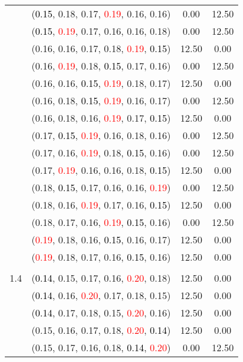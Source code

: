 \documentclass[10pt,a4paper]{report}
\begin{document}
\begin{center}
\begin{longtable}{clcc}
			&(\textcolor{black}{0.15}, 0.18, 0.17, \textcolor{red}{0.19}, 0.16, 0.16)&0.00&12.50\\
			&(\textcolor{black}{0.15}, \textcolor{red}{0.19}, 0.17, 0.16, 0.16, 0.18)&0.00&12.50\\
			&(0.16, 0.16, 0.17, 0.18, \textcolor{red}{0.19}, \textcolor{black}{0.15})&12.50&0.00\\
			&(0.16, \textcolor{red}{0.19}, 0.18, \textcolor{black}{0.15}, 0.17, 0.16)&0.00&12.50\\
			&(0.16, 0.16, \textcolor{black}{0.15}, \textcolor{red}{0.19}, 0.18, 0.17)&12.50&0.00\\
			&(0.16, 0.18, \textcolor{black}{0.15}, \textcolor{red}{0.19}, 0.16, 0.17)&0.00&12.50\\
			&(0.16, 0.18, 0.16, \textcolor{red}{0.19}, 0.17, \textcolor{black}{0.15})&12.50&0.00\\
			&(0.17, \textcolor{black}{0.15}, \textcolor{red}{0.19}, 0.16, 0.18, 0.16)&0.00&12.50\\
			&(0.17, 0.16, \textcolor{red}{0.19}, 0.18, \textcolor{black}{0.15}, 0.16)&0.00&12.50\\
			&(0.17, \textcolor{red}{0.19}, 0.16, 0.16, 0.18, \textcolor{black}{0.15})&12.50&0.00\\
			&(0.18, \textcolor{black}{0.15}, 0.17, 0.16, 0.16, \textcolor{red}{0.19})&0.00&12.50\\
			&(0.18, 0.16, \textcolor{red}{0.19}, 0.17, 0.16, \textcolor{black}{0.15})&12.50&0.00\\
			&(0.18, 0.17, 0.16, \textcolor{red}{0.19}, \textcolor{black}{0.15}, 0.16)&0.00&12.50\\
			&(\textcolor{red}{0.19}, 0.18, 0.16, \textcolor{black}{0.15}, 0.16, 0.17)&12.50&0.00\\
			&(\textcolor{red}{0.19}, 0.18, 0.17, 0.16, \textcolor{black}{0.15}, 0.16)&12.50&0.00\\
		&&&\\
		1.4			&(\textcolor{black}{0.14}, 0.15, 0.17, 0.16, \textcolor{red}{0.20}, 0.18)&12.50&0.00\\
			&(\textcolor{black}{0.14}, 0.16, \textcolor{red}{0.20}, 0.17, 0.18, 0.15)&12.50&0.00\\
			&(\textcolor{black}{0.14}, 0.17, 0.18, 0.15, \textcolor{red}{0.20}, 0.16)&12.50&0.00\\
			&(0.15, 0.16, 0.17, 0.18, \textcolor{red}{0.20}, \textcolor{black}{0.14})&12.50&0.00\\
			&(0.15, 0.17, 0.16, 0.18, \textcolor{black}{0.14}, \textcolor{red}{0.20})&0.00&12.50\\

\end{longtable}
\end{center}
\end{document}
